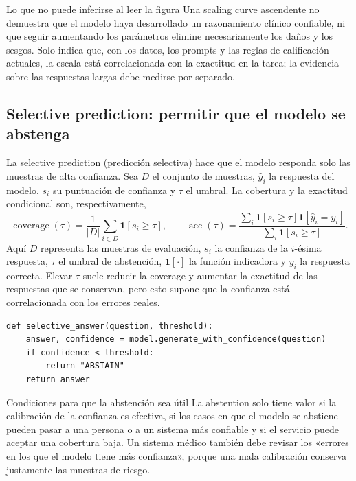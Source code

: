 \begin{warningbox}{Lo que no puede inferirse al leer la figura}
Una scaling curve ascendente no demuestra que el modelo haya desarrollado un razonamiento clínico confiable, ni que seguir aumentando los parámetros elimine necesariamente los daños y los sesgos. Solo indica que, con los datos, los prompts y las reglas de calificación actuales, la escala está correlacionada con la exactitud en la tarea; la evidencia sobre las respuestas largas debe medirse por separado.
\end{warningbox}

\subsection{Selective prediction: permitir que el modelo se abstenga}

La selective prediction (predicción selectiva) hace que el modelo responda solo las muestras de alta confianza. Sea $D$ el conjunto de muestras, $\hat y_i$ la respuesta del modelo, $s_i$ su puntuación de confianza y $\tau$ el umbral. La cobertura y la exactitud condicional son, respectivamente,
$$
\operatorname{coverage}(\tau)=\frac{1}{|D|}\sum_{i\in D}\mathbf{1}[s_i\ge\tau],
\qquad
\operatorname{acc}(\tau)=
\frac{\sum_i\mathbf{1}[s_i\ge\tau]\mathbf{1}[\hat y_i=y_i]}
{\sum_i\mathbf{1}[s_i\ge\tau]}.
$$
Aquí $D$ representa las muestras de evaluación, $s_i$ la confianza de la $i$-ésima respuesta, $\tau$ el umbral de abstención, $\mathbf{1}[\cdot]$ la función indicadora y $y_i$ la respuesta correcta. Elevar $\tau$ suele reducir la coverage y aumentar la exactitud de las respuestas que se conservan, pero esto supone que la confianza está correlacionada con los errores reales.


\begin{lstlisting}[caption={Flujo de umbralización de la predicción selectiva (esquemático)}]
def selective_answer(question, threshold):
    answer, confidence = model.generate_with_confidence(question)
    if confidence < threshold:
        return "ABSTAIN"
    return answer
\end{lstlisting}

\begin{importantbox}{Condiciones para que la abstención sea útil}
La abstention solo tiene valor si la calibración de la confianza es efectiva, si los casos en que el modelo se abstiene pueden pasar a una persona o a un sistema más confiable y si el servicio puede aceptar una cobertura baja. Un sistema médico también debe revisar los «errores en los que el modelo tiene más confianza», porque una mala calibración conserva justamente las muestras de riesgo.
\end{importantbox}

